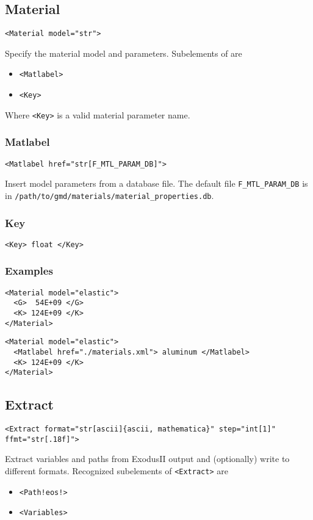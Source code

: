 \documentclass[11pt]{report}
\renewcommand{\tag}[1]{\texttt{<#1>}}
\newcommand{\reqdtag}[1]{\Red{\texttt{<#1>}}}
\newcommand{\sd}[1]{\texttt{!#1!}}
\begin{document}
\subsection{Material}
\begin{verbatim}
<Material model="str">
\end{verbatim}
%
Specify the material model and parameters. Subelements of \reqdtag{Material}
are
%
\begin{itemize}
  \item \tag{Matlabel}
  \item \tag{Key}
\end{itemize}
%
Where \tag{Key} is a valid material parameter name.

\subsubsection{Matlabel}
\begin{verbatim}
<Matlabel href="str[F_MTL_PARAM_DB]">
\end{verbatim}
%
Insert model parameters from a database file.  The default file
\verb|F_MTL_PARAM_DB| is in \verb|/path/to/gmd/materials/material_properties.db|.

\subsubsection{Key}
\begin{verbatim}
<Key> float </Key>
\end{verbatim}

\subsubsection{Examples}
\begin{verbatim}
<Material model="elastic">
  <G>  54E+09 </G>
  <K> 124E+09 </K>
</Material>
\end{verbatim}

\begin{verbatim}
<Material model="elastic">
  <Matlabel href="./materials.xml"> aluminum </Matlabel>
  <K> 124E+09 </K>
</Material>
\end{verbatim}

\subsection{Extract}
\begin{verbatim}
<Extract format="str[ascii]{ascii, mathematica}" step="int[1]" ffmt="str[.18f]">
\end{verbatim}
%
Extract variables and paths from ExodusII output and (optionally) write to
different formats. Recognized subelements of \tag{Extract} are
%
\begin{itemize}
  \item \tag{Path\sd{eos}}
  \item \tag{Variables}
\end{itemize}
\end{document}
